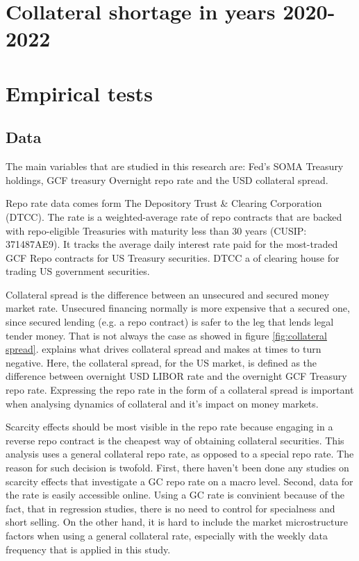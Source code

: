 \documentclass[11pt,a4paper,english,oneside]{article}
\begin{document}
\lipsum[1-20]

\section{Collateral shortage in years 2020-2022} \label{sec:shortage}%

\lipsum[1-20]

\section{Empirical tests} \label{sec:empirical}

\subsection{Data} %

The main variables that are studied in this research are: Fed's SOMA Treasury holdings, GCF treasury Overnight repo rate and the USD collateral spread.

Repo rate data comes form The Depository Trust \& Clearing Corporation (DTCC). The rate is a weighted-average rate of repo contracts that are backed with repo-eligible Treasuries with maturity less than 30 years (CUSIP: 371487AE9). It tracks the average daily interest rate paid for the most-traded GCF Repo contracts for US Treasury securities. DTCC a of clearing house for trading US government securities.

Collateral spread is the difference between an unsecured and secured money market rate. Unsecured financing normally is more expensive that a secured one, since secured lending (e.g. a repo contract) is safer to the leg that lends legal tender money. That is not always the case as showed in figure \ref{fig:collateral spread}. \citet{nyborg2019a} explains what drives collateral spread and makes at times to turn negative. Here, the collateral spread, for the US market, is defined as the difference between overnight USD LIBOR rate and the overnight GCF Treasury repo rate. Expressing the repo rate in the form of a collateral spread is important when analysing dynamics of collateral and it's impact on money markets. %

Scarcity effects should be most visible in the repo rate because engaging in a reverse repo contract is the cheapest way of obtaining collateral securities. This analysis uses a general collateral repo rate, as opposed to a special repo rate. The reason for such decision is twofold. First, there haven't been done any studies on scarcity effects that investigate a GC repo rate on a macro level. Second, data for the rate is easily accessible online. Using a GC rate is convinient because of the fact, that in regression studies, there is no need to control for specialness and short selling. On the other hand, it is hard to include the market microstructure factors when using a general collateral rate, especially with the weekly data frequency that is applied in this study.
\end{document}
